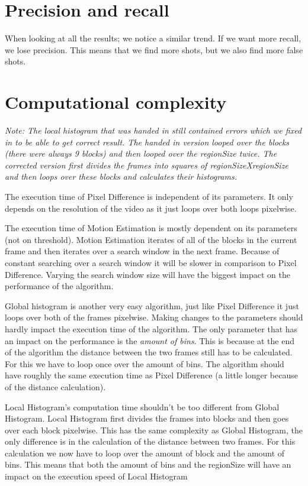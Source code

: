 \documentclass[a4paper,11pt,oneside]{article}
\begin{document}
\vspace{-0.5cm}
\section{Precision and recall}
\vspace{-0.5cm}
When looking at all the results; we notice a similar trend. If we want more recall, we lose
precision. This means that we find more shots, but we also find more false shots.
\vspace{-0.5cm}
\section{Computational complexity}
\vspace{-0.5cm}
\textit{Note: The local histogram that was handed in still contained errors which we fixed in to be able to get correct result. The handed in version looped over the blocks (there were always 9 blocks) and then looped over the regionSize twice. The corrected version first divides the frames into squares of regionSizeXregionSize and then loops over these blocks and calculates their histograms.}\par
The execution time of Pixel Difference is independent of its parameters. It only depends on the resolution of the video as it just loops over both loops pixelwise.\par
The execution time of Motion Estimation is mostly dependent on its parameters (not on threshold). Motion Estimation iterates of all of the blocks in the current frame and then iterates over a search window in the next frame. Because of constant searching over a search window it will be slower in comparison to Pixel Difference. Varying the search window size will have the biggest impact on the performance of the algorithm.\par
Global histogram is another very easy algorithm, just like Pixel Difference it just loops over both of the frames pixelwise. Making changes to the parameters should hardly impact the execution time of the algorithm. The only parameter that has an impact on the performance is the \textit{amount of bins}. This is because at the end of the algorithm the distance between the two frames still has to be calculated. For this we have to loop once over the amount of bins. The algorithm should have roughly the same execution time as Pixel Difference (a little longer because of the distance calculation).\par
Local Histogram's computation time shouldn't be too different from Global Histogram. Local Histogram first divides the frames into blocks and then goes over each block pixelwise. This has the same complexity as Global Histogram, the only difference is in the calculation of the distance between two frames. For this calculation we now have to loop over the amount of block and the amount of bins. This means that both the amount of bins and the regionSize will have an impact on the execution speed of Local Histogram\par
\end{document}
